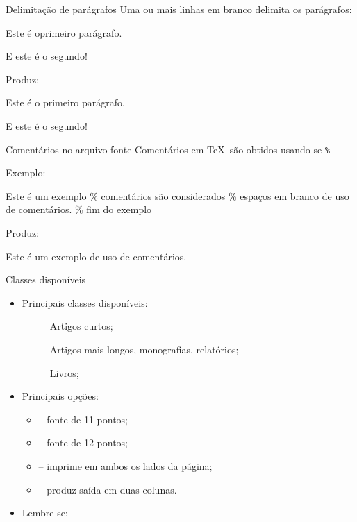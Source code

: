 \begin{frame}{Delimitação de parágrafos}
Uma ou mais linhas em branco delimita os parágrafos:

\begin{LaTeXcode}[Exemplo]
Este é o\textvisiblespace\textvisiblespace\textvisiblespace\textvisiblespace primeiro \n parágrafo.\n

E este é o segundo!
\end{LaTeXcode}

Produz:
\begin{LaTeXoutput}
Este é o         primeiro
parágrafo.

E este é o segundo!
\end{LaTeXoutput}
\end{frame}

\begin{frame}{Comentários no arquivo fonte}
Comentários em \TeX\ são obtidos usando-se \texttt{\%}

Exemplo:
\begin{LaTeXcode}
Este é um exemplo\n
\% comentários são considerados\n
\% espaços em branco\n
de uso de comentários. \% fim do exemplo
\end{LaTeXcode}

Produz:
\begin{LaTeXoutput}
Este é um exemplo
de uso de comentários. %
\end{LaTeXoutput}
\end{frame}

\begin{frame}{Classes disponíveis}
\begin{itemize}
\item Principais classes disponíveis:
\begin{description}
\item [] Artigos curtos;
\item [] Artigos mais longos, monografias, relatórios;
\item [] Livros;
\end{description}

\medskip

\item Principais opções: 

\medskip

\begin{itemize}
\item \Lopt{11pt} -- fonte de 11 pontos;
\item \Lopt{12pt} -- fonte de 12 pontos;
\item {} -- imprime em ambos os lados da página;
\item {} -- produz saída em duas colunas.
\end{itemize}

\medskip

\item Lembre-se: 
\end{itemize}
\end{frame}

